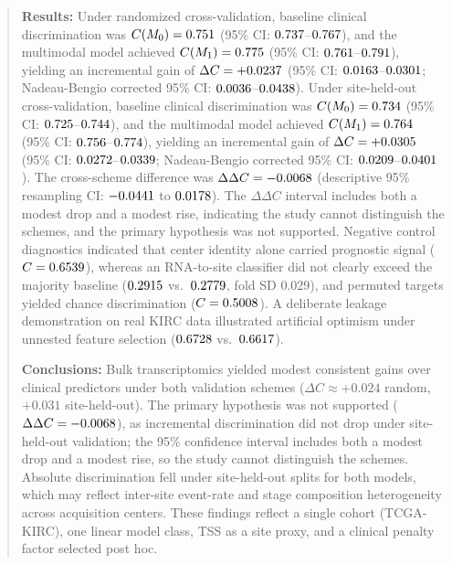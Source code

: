 \documentclass{article}
\begin{document}
\begin{abstract}
\textbf{Results:} Under randomized cross-validation, baseline clinical discrimination was $C(M_0) = \CMZeroRandom$ (95\% CI: $\CIMZeroLowRandom$--$\CIMZeroHighRandom$), and the multimodal model achieved $C(M_1) = \CMOneRandom$ (95\% CI: $\CIMOneLowRandom$--$\CIMOneHighRandom$), yielding an incremental gain of $\Delta C = +\DeltaCRandom$ (95\% CI: $\CIDeltaLowRandom$--$\CIDeltaHighRandom$; Nadeau-Bengio corrected 95\% CI: $\CINBLowRandom$--$\CINBHighRandom$). Under site-held-out cross-validation, baseline clinical discrimination was $C(M_0) = \CMZeroSite$ (95\% CI: $\CIMZeroLowSite$--$\CIMZeroHighSite$), and the multimodal model achieved $C(M_1) = \CMOneSite$ (95\% CI: $\CIMOneLowSite$--$\CIMOneHighSite$), yielding an incremental gain of $\Delta C = +\DeltaCSite$ (95\% CI: $\CIDeltaLowSite$--$\CIDeltaHighSite$; Nadeau-Bengio corrected 95\% CI: $\CINBLowSite$--$\CINBHighSite$). The cross-scheme difference was $\Delta\Delta C = \DeltaDeltaC$ (descriptive 95\% resampling CI: $\CIDeltaDeltaLow$ to $\CIDeltaDeltaHigh$). The $\Delta\Delta C$ interval includes both a modest drop and a modest rise, indicating the study cannot distinguish the schemes, and the primary hypothesis was not supported. Negative control diagnostics indicated that center identity alone carried prognostic signal ($C = \SiteOnlyCMean$), whereas an RNA-to-site classifier did not clearly exceed the majority baseline ($\RNASiteAccuracy$ vs.\ $\RNASiteBaseline$, fold SD 0.029), and permuted targets yielded chance discrimination ($C = \ShuffledCMean$). A deliberate leakage demonstration on real KIRC data illustrated artificial optimism under unnested feature selection ($\CanaryLeakedCMean$ vs.\ $\CanaryNestedCMean$).

\textbf{Conclusions:} Bulk transcriptomics yielded modest consistent gains over clinical predictors under both validation schemes ($\Delta C \approx +0.024$ random, $+0.031$ site-held-out). The primary hypothesis was not supported ($\Delta\Delta C = \DeltaDeltaC$), as incremental discrimination did not drop under site-held-out validation; the 95\% confidence interval includes both a modest drop and a modest rise, so the study cannot distinguish the schemes. Absolute discrimination fell under site-held-out splits for both models, which may reflect inter-site event-rate and stage composition heterogeneity across acquisition centers. These findings reflect a single cohort (TCGA-KIRC), one linear model class, TSS as a site proxy, and a clinical penalty factor selected post hoc.
\end{abstract}
\end{document}
